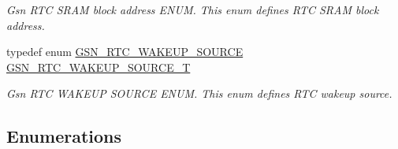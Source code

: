 \begin{DoxyCompactItemize}
\begin{DoxyCompactList}\small\item\em Gsn RTC SRAM block address ENUM. This enum defines RTC SRAM block address. \end{DoxyCompactList}\item 
typedef enum \hyperlink{a00651_gae287d9e78906e2c47d820fbde51a862e}{GSN\_\-RTC\_\-WAKEUP\_\-SOURCE} \hyperlink{a00651_gaf7c5ef16a16838e7cbfc58bda46355bc}{GSN\_\-RTC\_\-WAKEUP\_\-SOURCE\_\-T}
\begin{DoxyCompactList}\small\item\em Gsn RTC WAKEUP SOURCE ENUM. This enum defines RTC wakeup source. \end{DoxyCompactList}\end{DoxyCompactItemize}
\subsection*{Enumerations}
